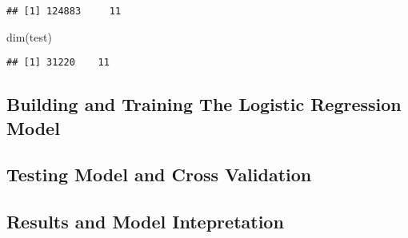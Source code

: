 \documentclass[
]{article}
\newenvironment{Shaded}{\begin{snugshade}}{\end{snugshade}}
\newcommand{\AttributeTok}[1]{\textcolor[rgb]{0.77,0.63,0.00}{#1}}
\newcommand{\CommentTok}[1]{\textcolor[rgb]{0.56,0.35,0.01}{\textit{#1}}}
\newcommand{\ConstantTok}[1]{\textcolor[rgb]{0.00,0.00,0.00}{#1}}
\newcommand{\DecValTok}[1]{\textcolor[rgb]{0.00,0.00,0.81}{#1}}
\newcommand{\FloatTok}[1]{\textcolor[rgb]{0.00,0.00,0.81}{#1}}
\newcommand{\FunctionTok}[1]{\textcolor[rgb]{0.00,0.00,0.00}{#1}}
\newcommand{\NormalTok}[1]{#1}
\newcommand{\OtherTok}[1]{\textcolor[rgb]{0.56,0.35,0.01}{#1}}
\newcommand{\SpecialCharTok}[1]{\textcolor[rgb]{0.00,0.00,0.00}{#1}}
\begin{document}
\begin{Shaded}
\end{Shaded}

\begin{verbatim}
## [1] 124883     11
\end{verbatim}

\begin{Shaded}
\begin{Highlighting}[]
\FunctionTok{dim}\NormalTok{(test)}
\end{Highlighting}
\end{Shaded}

\begin{verbatim}
## [1] 31220    11
\end{verbatim}

\hypertarget{building-and-training-the-logistic-regression-model}{%
\subsection{Building and Training The Logistic Regression
Model}\label{building-and-training-the-logistic-regression-model}}

\hypertarget{testing-model-and-cross-validation}{%
\subsection{Testing Model and Cross
Validation}\label{testing-model-and-cross-validation}}

\hypertarget{results-and-model-intepretation}{%
\subsection{Results and Model
Intepretation}\label{results-and-model-intepretation}}
\end{document}
